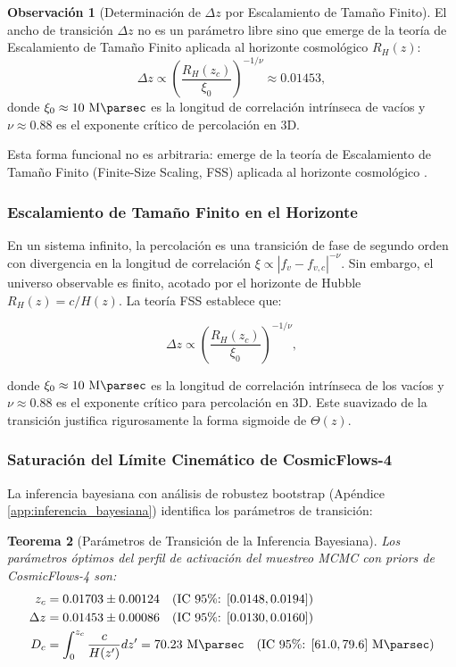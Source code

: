 \documentclass[11pt, a4paper]{article}
\theoremstyle{plain}
\newtheorem{teorema}{Teorema}[section]
\theoremstyle{definition}
\newtheorem{observacion}[teorema]{Observación}
\begin{document}
\begin{observacion}[Determinación de $\Delta z$ por Escalamiento de Tamaño Finito]
El ancho de transición $\Delta z$ no es un parámetro libre sino que emerge de la teoría de Escalamiento de Tamaño Finito aplicada al horizonte cosmológico $R_H(z)$:
\begin{equation}
\Delta z \propto \left(\frac{R_H(z_c)}{\xi_0}\right)^{-1/\nu} \approx 0.01453,
\end{equation}
donde $\xi_0 \approx 10\ \si{\mega\parsec}$ es la longitud de correlación intrínseca de vacíos y $\nu \approx 0.88$ es el exponente crítico de percolación en 3D.
\end{observacion}

Esta forma funcional no es arbitraria: emerge de la teoría de Escalamiento de Tamaño Finito (Finite-Size Scaling, FSS) aplicada al horizonte cosmológico \cite{Cardy1996}.

\subsubsection{Escalamiento de Tamaño Finito en el Horizonte}

En un sistema infinito, la percolación es una transición de fase de segundo orden con divergencia en la longitud de correlación $\xi \propto |f_v - f_{v,c}|^{-\nu}$. Sin embargo, el universo observable es finito, acotado por el horizonte de Hubble $R_H(z) = c/H(z)$. La teoría FSS establece que:

\begin{equation}
\Delta z \propto \left(\frac{R_H(z_c)}{\xi_0}\right)^{-1/\nu},
\label{eq:fss_scaling}
\end{equation}

donde $\xi_0 \approx 10\ \si{\mega\parsec}$ es la longitud de correlación intrínseca de los vacíos y $\nu \approx 0.88$ es el exponente crítico para percolación en 3D. Este suavizado de la transición justifica rigurosamente la forma sigmoide de $\Theta(z)$.

\subsubsection{Saturación del Límite Cinemático de CosmicFlows-4}

La inferencia bayesiana con análisis de robustez bootstrap (Apéndice \ref{app:inferencia_bayesiana}) identifica los parámetros de transición:

\begin{teorema}[Parámetros de Transición de la Inferencia Bayesiana]
Los parámetros óptimos del perfil de activación del muestreo MCMC con priors de CosmicFlows-4 son:
\begin{align}
z_c &= 0.01703 \pm 0.00124 \quad (\text{IC 95\%: } [0.0148, 0.0194]) \\
\Delta z &= 0.01453 \pm 0.00086 \quad (\text{IC 95\%: } [0.0130, 0.0160]) \\
D_c &= \int_0^{z_c} \frac{c}{H(z')} dz' = 70.23\ \si{\mega\parsec} \quad (\text{IC 95\%: } [61.0, 79.6]\ \si{\mega\parsec})
\end{align}
\end{teorema}
\end{document}
